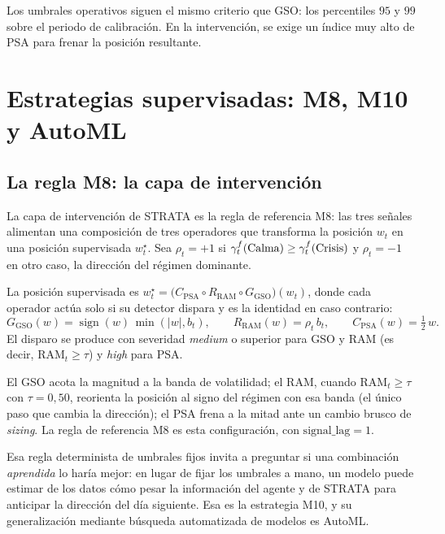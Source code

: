 Los umbrales operativos siguen el mismo criterio que GSO: los percentiles $95$ y $99$ sobre el periodo de calibración. En la intervención, se exige un índice muy alto de PSA para frenar la posición resultante.

\section{Estrategias supervisadas: M8, M10 y AutoML}
\label{sec:strata-estrategias}

\subsection{La regla M8: la capa de intervención}
\label{sec:strata-intervencion}

La capa de intervención de STRATA es la regla de referencia M8: las tres señales alimentan una composición de tres operadores que transforma la posición $w_t$ en una posición supervisada $w_t^{\star}$. Sea $\rho_t = +1$ si $\gamma^{f}_t(\text{Calma}) \ge \gamma^{f}_t(\text{Crisis})$ y $\rho_t = -1$ en otro caso, la dirección del régimen dominante.

\begin{definicion}
\label{def:m8}
La posición supervisada es $w_t^{\star} = \big(C_{\mathrm{PSA}} \circ R_{\mathrm{RAM}} \circ G_{\mathrm{GSO}}\big)(w_t)$, donde cada operador actúa solo si su detector dispara y es la identidad en caso contrario:
\[
G_{\mathrm{GSO}}(w) = \operatorname{sign}(w)\,\min(|w|, b_t),
\qquad
R_{\mathrm{RAM}}(w) = \rho_t\, b_t,
\qquad
C_{\mathrm{PSA}}(w) = \tfrac{1}{2}\, w.
\]
El disparo se produce con severidad \emph{medium} o superior para GSO y RAM (es decir, $\mathrm{RAM}_t \ge \tau$) y \emph{high} para PSA.
\end{definicion}

El GSO acota la magnitud a la banda de volatilidad; el RAM, cuando $\mathrm{RAM}_t \ge \tau$ con $\tau = 0{,}50$, reorienta la posición al signo del régimen con esa banda (el único paso que cambia la dirección); el PSA frena a la mitad ante un cambio brusco de \emph{sizing}. La regla de referencia M8 es esta configuración, con $\mathrm{signal\_lag} = 1$.

Esa regla determinista de umbrales fijos invita a preguntar si una combinación \emph{aprendida} lo haría mejor: en lugar de fijar los umbrales a mano, un modelo puede estimar de los datos cómo pesar la información del agente y de STRATA para anticipar la dirección del día siguiente. Esa es la estrategia M10, y su generalización mediante búsqueda automatizada de modelos es AutoML.

